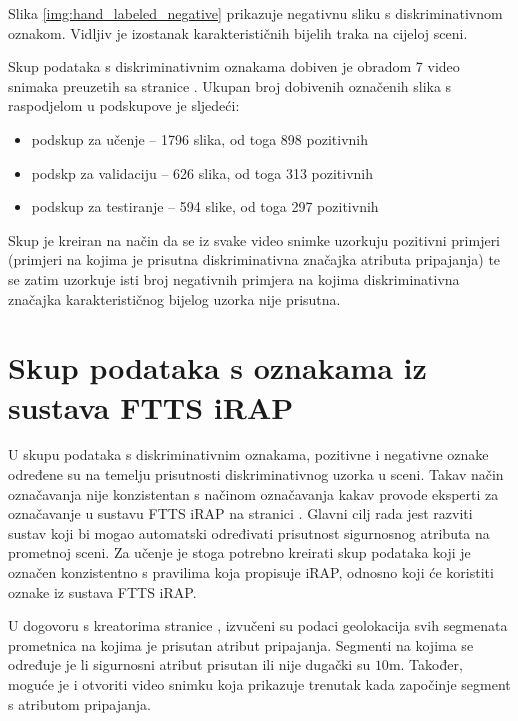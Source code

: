 \documentclass[times, utf8, diplomski, numeric]{fer}
\begin{document}
\noindent Slika \ref{img:hand_labeled_negative} prikazuje negativnu sliku s diskriminativnom oznakom.
Vidljiv je izostanak karakterističnih bijelih traka na cijeloj sceni.

Skup podataka s diskriminativnim oznakama dobiven je obradom 7 video snimaka preuzetih sa stranice \citep{url:ftts_irap}. 
Ukupan broj dobivenih označenih slika s raspodjelom u podskupove je sljedeći:
\begin{itemize}
 \item podskup za učenje -- 1796 slika, od toga 898 pozitivnih
 \item podskp za validaciju -- 626 slika, od toga 313 pozitivnih
 \item podskup za testiranje -- 594 slike, od toga 297 pozitivnih
\end{itemize}

\noindent Skup je kreiran na način da se iz svake video snimke uzorkuju pozitivni primjeri (primjeri na kojima je prisutna diskriminativna značajka atributa pripajanja) te se zatim uzorkuje isti broj negativnih primjera na kojima diskriminativna značajka karakterističnog bijelog uzorka nije prisutna.

\section{Skup podataka s oznakama iz sustava FTTS iRAP}
U skupu podataka s diskriminativnim oznakama, pozitivne i negativne oznake određene su na temelju prisutnosti diskriminativnog uzorka u sceni. 
Takav način označavanja nije konzistentan s načinom označavanja kakav provode eksperti za označavanje u sustavu FTTS iRAP na stranici \citep{url:ftts_irap}.
Glavni cilj rada jest razviti sustav koji bi mogao automatski određivati prisutnost sigurnosnog atributa na prometnoj sceni. 
Za učenje je stoga potrebno kreirati skup podataka koji je označen konzistentno s pravilima koja propisuje iRAP, odnosno koji će koristiti oznake iz sustava FTTS iRAP.

U dogovoru s kreatorima stranice \citep{url:ftts_irap}, izvučeni su podaci geolokacija svih segmenata prometnica na kojima je prisutan atribut pripajanja. 
Segmenti na kojima se određuje je li sigurnosni atribut prisutan ili nije dugački su $10$m.
Također, moguće je i otvoriti video snimku koja prikazuje trenutak kada započinje segment s atributom pripajanja.
\end{document}
